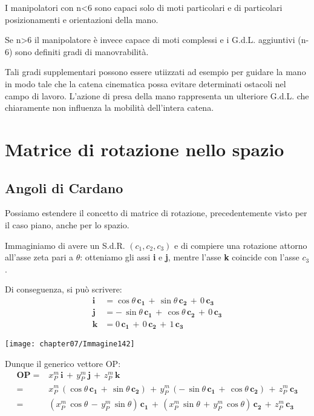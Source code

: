I manipolatori con n<6 sono capaci solo di moti particolari e di particolari posizionamenti e orientazioni della mano.

Se n>6 il manipolatore è invece capace di moti complessi e i G.d.L. aggiuntivi (n-6) sono definiti gradi di manovrabilità.

Tali gradi supplementari possono essere utiizzati ad esempio per guidare la mano in modo tale che la catena cinematica possa evitare determinati ostacoli nel campo di lavoro. L'azione di presa della mano rappresenta un ulteriore G.d.L. che chiaramente non influenza la mobilità dell'intera catena.

\section{Matrice di rotazione nello spazio}
	\subsection{Angoli di Cardano}

	\begin{minipage}{.6\textwidth}	
	Possiamo estendere il concetto di matrice di rotazione, precedentemente visto per il caso piano, anche per lo spazio. 
	
	Immaginiamo di avere un S.d.R. $(c_1, c_2, c_3)$ e di compiere una rotazione attorno all'asse zeta pari a $\theta$: otteniamo gli assi \textbf{i} e \textbf{j}, mentre l'asse \textbf{k} coincide con l'asse $c_3$. 
	
	Di conseguenza, si può scrivere:
\begin{align*}
\mathbf{i} &= \cos{\theta}\,\mathbf{c_1}\,+\,\sin{\theta}\,\mathbf{c_2}\,+\,0\,\mathbf{c_3}\\ 
\mathbf{j} &= -\,\sin{\theta}\,\mathbf{c_1}\,+\,\cos{\theta}\,\mathbf{c_2}\,+\,0\,\mathbf{c_3}\\
\mathbf{k} &= 0\,\mathbf{c_1}\,+\,0\,\mathbf{c_2}\,+\,1\,\mathbf{c_3}
\end{align*}
\end{minipage}
\hfill
\begin{minipage}{.35\textwidth}
\centering
\texttt{[image: chapter07/Immagine142]}
\end{minipage}

Dunque il generico vettore OP:
\begin{align*}
\mathbf{OP} =& x_P^m\,\mathbf{i}\,+\,y_P^m\,\mathbf{j}\,+\,z_P^m\,\mathbf{k}\\
=& x_P^m\,(\cos{\theta}\,\mathbf{c_1}\,+\,\sin{\theta}\,\mathbf{c_2})\,+\,y_P^m\,(-\,\sin{\theta}\,\mathbf{c_1}\,+\,\cos{\theta}\,\mathbf{c_2})\,+\,z_P^m\,\mathbf{c_3}\\
=& (x_P^m\,\cos{\theta}\,-\,y_P^m\,\sin{\theta})\,\mathbf{c_1}\,+\,(x_P^m\,\sin{\theta}\,+\,y_P^m\,\cos{\theta})\,\mathbf{c_2}\,+\,z_P^m\,\mathbf{c_3}
\end{align*}

